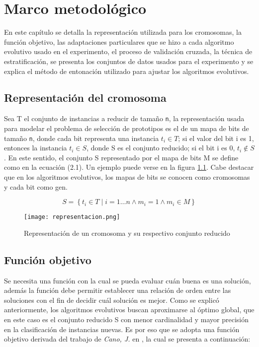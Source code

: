 \chapter{Marco metodológico}
\label{capitulo2}

En este capítulo se detalla la representación utilizada para los cromosomas, la función objetivo, las adaptaciones particulares que se hizo a cada algoritmo evolutivo usado en el experimento, el proceso de validación cruzada, la técnica de estratificación, se presenta los conjuntos de datos usados para el experimento y se explica el método de entonación utilizado para ajustar los algoritmos evolutivos.

\section{Representación del cromosoma}

Sea T el conjunto de instancias a reducir de tamaño \texttt{n}, la representación usada para modelar el problema de selección de prototipos es el de un mapa de bits de tamaño \texttt{n}, donde cada bit representa una instancia $t_i \in T$; si el valor del bit i es 1, entonces la instancia $t_i \in S$, donde S es el conjunto reducido; si el bit i es 0, $t_i \notin S$. En este sentido, el conjunto S representado por el mapa de bits M se define como en la ecuación (2.1). Un ejemplo puede verse en la figura \ref{representacion}. Cabe destacar que en los algoritmos evolutivos, los mapas de bits se conocen como cromosomas y cada bit como gen.

\begin{equation}
S = \left\{ t_i \in T \mid i = 1 \dots n \land m_i = 1 \land m_i \in M \right\}
\end{equation} 

\begin{figure}[]
\centering
\texttt{[image: representacion.png]}
\caption[Representación de un cromosoma y su respectivo conjunto reducido]{Representación de un cromosoma y su respectivo conjunto reducido}
\label{representacion}
\end{figure}

\section{Función objetivo}

Se necesita una función con la cual se pueda evaluar cuán buena es una solución, además la función debe permitir establecer una relación de orden entre las soluciones con el fin de decidir cuál solución es mejor. Como se explicó anteriormente, los algoritmos evolutivos buscan aproximarse al óptimo global, que en este caso es el conjunto reducido S con menor cardinalidad y mayor precisión en la clasificación de instancias nuevas. Es por eso que se adopta una función objetivo derivada del trabajo de \emph{Cano, J.} en \cite{de2004reduccion}, la cual se presenta a continuación:


